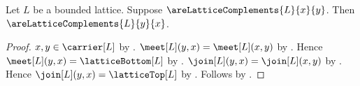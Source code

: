 \begin{proposition}\label{are_lattice_complements_symmetric}
    Let $L$ be a bounded lattice.
    Suppose $\areLatticeComplements{L}{x}{y}$.
    Then $\areLatticeComplements{L}{y}{x}$.
\end{proposition}
\begin{proof}
    $x,y\in\carrier[L]$ by
        .
    $\meet[L](y,x)=\meet[L](x,y)$ by .
    Hence $\meet[L](y,x)=\latticeBottom[L]$ by
        .
    $\join[L](y,x)=\join[L](x,y)$ by .
    Hence $\join[L](y,x)=\latticeTop[L]$ by
        .
    Follows by .
\end{proof}

